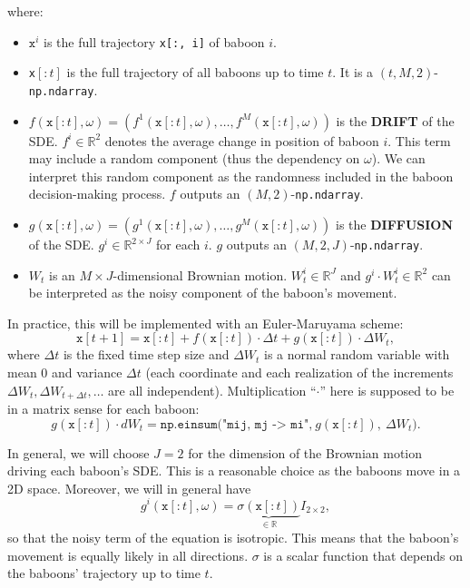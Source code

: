 \documentclass[
    article,
    oneside,
]{memoir}
\begin{document}
where:
\begin{itemize}
    \item $\texttt{x}^i$ is the full trajectory \texttt{x[:, i]} of baboon $i$.
    \item \texttt{x}$[:t]$ is the full trajectory of all baboons up to time $t$.
        It is a $(t, M, 2)$-\texttt{np.ndarray}.
    \item $f(\texttt{x}[:t], \omega) = (f^1(\texttt{x}[:t], \omega), \dots, f^M(\texttt{x}[:t], \omega))$ is the \textbf{DRIFT} of the SDE.
        \(f^i\in\mathbb R^2\) denotes the average change in position of baboon $i$.
        This term may include a random component (thus the dependency on
        $\omega$). We can interpret this random component as the randomness included in the baboon decision-making process.
        $f$ outputs an $(M, 2)$-\texttt{np.ndarray}.
    \item $g(\texttt{x}[:t], \omega) = (g^1(\texttt{x}[:t], \omega), \dots, g^M(\texttt{x}[:t], \omega))$ is the \textbf{DIFFUSION} of the SDE.
        \(g^i\in\mathbb R^{2\times J}\) for each $i$.
        $g$ outputs an $(M, 2, J)$-\texttt{np.ndarray}.
    \item $W_t$ is an $M \times J$-dimensional Brownian motion. $W^i_t\in \mathbb{R}^J$ and \(g^i\cdot W^i_t\in\mathbb{R}^2\) can be interpreted as the noisy component of the baboon's movement. 
\end{itemize}

In practice, this will be implemented with an Euler-Maruyama scheme:
\begin{equation}\label{eq:euler-maruyama}
    \texttt{x}[t+1] = \texttt{x}[:t] + f(\texttt{x}[:t]) \cdot \Delta t + g(\texttt{x}[:t]) \cdot \Delta W_t,
\end{equation}
where $\Delta t$ is the fixed time step size and $\Delta W_t$ is a normal random variable
with mean $0$ and variance $\Delta t$ (each coordinate and each realization of the increments $\Delta W_t,\Delta W_{t+\Delta t},\dots$ are all independent). Multiplication ``$\cdot$'' here is supposed to be in a
matrix sense for each baboon:
\begin{equation}
    g(\texttt{x}[:t]) \cdot dW_t = \texttt{np.einsum("mij, mj -> mi",}\ g(\texttt{x}[:t]),\ \Delta W_t\texttt{)}.
\end{equation}

In general, we will choose \(J = 2\) for the dimension of the Brownian motion driving each baboon's SDE. This is a reasonable choice as the baboons move in a 2D space. Moreover, we will in general have 
\[
    g^i(\texttt{x}[:t], \omega) = \underbrace{\sigma(\texttt{x}[:t])}_{\in\mathbb R} I_{2\times 2},
\]
so that the noisy term of the equation is isotropic. This means that the baboon's movement is equally likely in all directions. $\sigma$ is a scalar function that depends on the baboons' trajectory up to time $t$.
\end{document}
